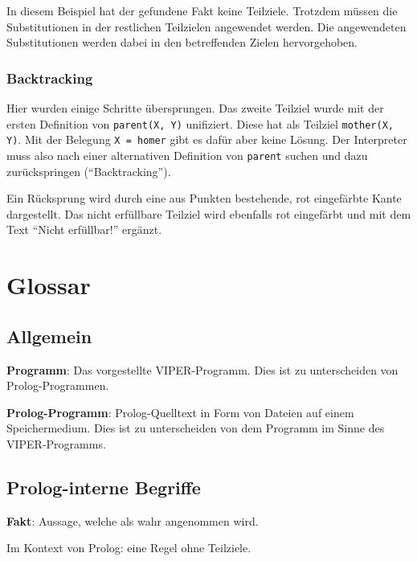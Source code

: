 \documentclass[parskip=full,11pt,twoside]{scrartcl}
\begin{document}
In diesem Beispiel hat der gefundene Fakt keine Teilziele.
Trotzdem müssen die Substitutionen in der restlichen Teilzielen angewendet werden.
Die angewendeten Substitutionen werden dabei in den betreffenden Zielen hervorgehoben.

\subsubsection{Backtracking}

Hier wurden einige Schritte übersprungen.
Das zweite Teilziel wurde mit der ersten Definition von \texttt{parent(X, Y)} unifiziert.
Diese hat als Teilziel \texttt{mother(X, Y)}.
Mit der Belegung \texttt{X = homer} gibt es dafür aber keine Lösung.
Der Interpreter muss also nach einer alternativen Definition von \texttt{parent} suchen und dazu zurückspringen (\enquote{Backtracking}).

\begin{minipage}{\linewidth}
\end{minipage}

Ein Rücksprung wird durch eine aus Punkten bestehende, rot eingefärbte Kante dargestellt.
Das nicht erfüllbare Teilziel wird ebenfalls rot eingefärbt und mit dem Text \enquote{Nicht erfüllbar!} ergänzt.

\section{Glossar}

\subsection{Allgemein}

\textbf{Programm}:
Das vorgestellte VIPER-Programm. Dies ist zu unterscheiden von Prolog-Programmen.

\textbf{Prolog-Programm}:
Prolog-Quelltext in Form von Dateien auf einem Speichermedium. Dies ist zu unterscheiden von dem Programm im Sinne des VIPER-Programms.

\subsection{Prolog-interne Begriffe}
\textbf{Fakt}:
Aussage, welche als wahr angenommen wird.

Im Kontext von Prolog: eine Regel ohne Teilziele.
\end{document}
